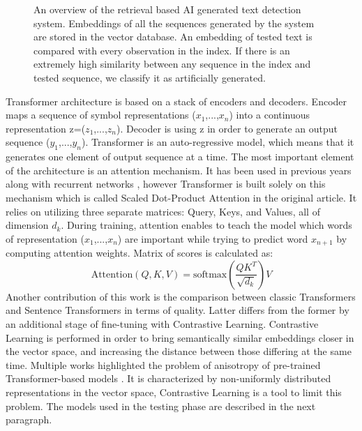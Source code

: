 \documentclass[12pt]{report}
\begin{document}
\newline\newline
\begin{figure}[htp]
    \centering
    
    \caption{An overview of the retrieval based AI generated text detection system. Embeddings of all the sequences generated by the system are stored in the vector database. An embedding of tested text is compared with every observation in the index. If there is an extremely high similarity between any sequence in the index and tested sequence, we classify it as artificially generated.}
    \label{fig:retrieval}
\end{figure}
\newline \newline
Transformer architecture \cite{vaswani2023attention} is based on a stack of encoders and decoders. Encoder maps a sequence of symbol representations ($x_1$,...,$x_n$) into a continuous representation z=($z_1$,...,$z_n$). Decoder is using z in order to generate an output sequence ($y_1$,...,$y_n$). Transformer is an auto-regressive model, which means that it generates one element of output sequence at a time. The most important element of the architecture is an attention mechanism. It has been used in previous years along with recurrent networks \citep{bahdanau2016neural, kim2017structured}, however Transformer is built solely on this mechanism which is called Scaled Dot-Product Attention in the original article. It relies on utilizing three separate matrices: Query, Keys, and Values, all of dimension $d_k$. During training, attention enables to teach the model which words of representation ($x_1$,...,$x_n$) are important while trying to predict word $x_{n+1}$ by computing attention weights. Matrix of scores is calculated as:
\newline 
 \begin{equation}
    \text{Attention}(Q, K, V) = \text{softmax}\left(\frac{QK^T}{\sqrt{d_k}}\right)V
\end{equation}
\newline
Another contribution of this work is the comparison between classic Transformers and Sentence Transformers \cite{sentencebert} in terms of quality. Latter differs from the former by an additional stage of fine-tuning with Contrastive Learning. Contrastive Learning is performed in order to bring semantically similar embeddings closer in the vector space, and increasing the distance between those differing at the same time. Multiple works highlighted the problem of anisotropy of pre-trained Transformer-based models \citep{clustersmanifolds, ethayarajh2019contextual, rajaee2021clusterbased}. It is characterized by non-uniformly distributed representations in the vector space, Contrastive Learning is a tool to limit this problem. The models used in the testing phase are described in the next paragraph.
\end{document}
